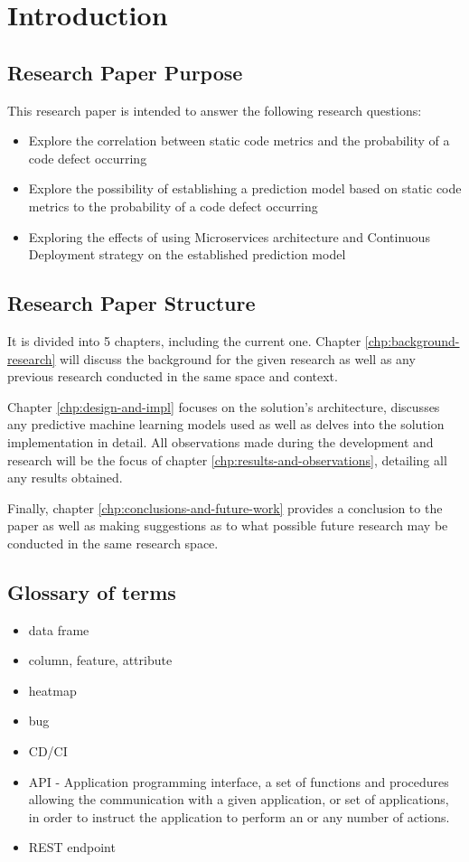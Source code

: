 \chapter{Introduction}\label{chp:intro}
\section{Research Paper Purpose}
This research paper is intended to answer the following research questions:
\begin{itemize}
\item Explore the correlation between static code metrics and the probability of a code defect occurring
\item Explore the possibility of establishing a prediction model based on static code metrics to the probability of a code defect occurring 
\item Exploring the effects of using Microservices architecture and Continuous Deployment strategy on the established prediction model
\end{itemize}
\section{Research Paper Structure}
It is divided into 5 chapters, including the current one. Chapter \ref{chp:background-research} will discuss the background for the given research as well as any previous research conducted in the same space and context. 

Chapter \ref{chp:design-and-impl} focuses on the solution's architecture, discusses any predictive machine learning models used as well as delves into the solution implementation in detail. All observations made during the development and research will be the focus of chapter \ref{chp:results-and-observations}, detailing all any results obtained.

Finally, chapter \ref{chp:conclusions-and-future-work} provides a conclusion to the paper as well as making suggestions as to what possible future research may be conducted in the same research space.

\section{Glossary of terms}
\begin{itemize}
    \item data frame
    \item column, feature, attribute
    \item heatmap
    \item bug
    \item CD/CI
    \item API - Application programming interface, a set of functions and procedures allowing the communication with a given application, or set of applications, in order to instruct the application to perform an or any number of actions.
    \item REST endpoint
\end{itemize}